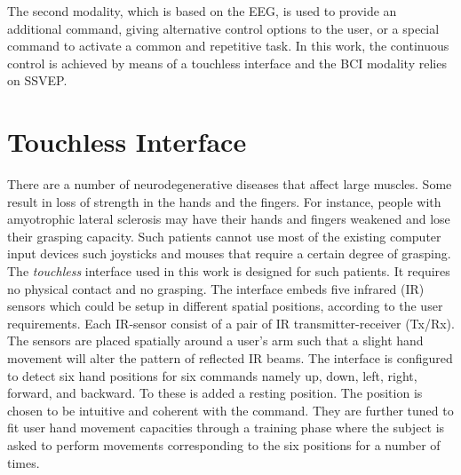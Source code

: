 The second modality, which is based on the EEG, is used to provide an additional command, giving alternative control options to the user, or a special command to activate a common and repetitive task.
In this work, the continuous control is achieved by means of a touchless interface and the BCI modality relies on SSVEP. 

\section{Touchless Interface}
\label{sec:touchless-interface}

There are a number of neurodegenerative diseases that affect large muscles. Some result in loss of strength in the hands and the fingers.
For instance, people with amyotrophic lateral sclerosis may have their hands and fingers weakened and lose their grasping capacity.
Such patients cannot use most of the existing computer input devices such joysticks and mouses that require a certain degree of grasping. 
The \emph{touchless} interface used in this work is designed for such patients. 
It requires no physical contact and no grasping.
The interface embeds five infrared (IR) sensors which could be setup in different spatial positions, according to the user requirements.
Each IR-sensor consist of a pair of IR transmitter-receiver (Tx/Rx). 
The sensors are placed spatially around a user's arm such that a slight hand movement will alter the pattern of reflected IR beams.
The interface is configured to detect six hand positions for six commands namely up, down, left, right, forward, and backward.
To these is added a resting position.
The position is chosen to be intuitive and coherent with the command. They are further tuned to fit user hand movement capacities through a training phase where the subject is asked to perform movements corresponding to the six positions for a number of times.

